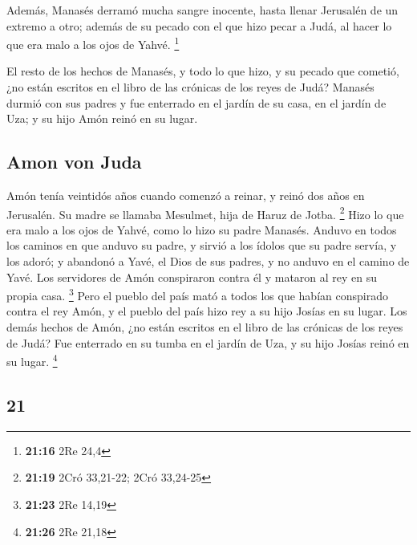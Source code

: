 \begin{paracol}{2}
 Además, Manasés derramó mucha sangre inocente, hasta
llenar Jerusalén de un extremo a otro; además de su pecado con el que
hizo pecar a Judá, al hacer lo que era malo a los ojos de Yahvé.
\footnote{\textbf{21:16} 2Re 24,4}

 El resto de los hechos de Manasés, y todo lo que hizo, y
su pecado que cometió, ¿no están escritos en el libro de las crónicas de
los reyes de Judá?  Manasés durmió con sus padres y fue
enterrado en el jardín de su casa, en el jardín de Uza; y su hijo Amón
reinó en su lugar.

\hypertarget{amon-von-juda}{%
\subsection{Amon von Juda}\label{amon-von-juda}}

 Amón tenía veintidós años cuando comenzó a reinar, y
reinó dos años en Jerusalén. Su madre se llamaba Mesulmet, hija de Haruz
de Jotba. \footnote{\textbf{21:19} 2Cró 33,21-22; 2Cró 33,24-25}
 Hizo lo que era malo a los ojos de Yahvé, como lo hizo
su padre Manasés.  Anduvo en todos los caminos en que
anduvo su padre, y sirvió a los ídolos que su padre servía, y los adoró;
 y abandonó a Yavé, el Dios de sus padres, y no anduvo en
el camino de Yavé.  Los servidores de Amón conspiraron
contra él y mataron al rey en su propia casa. \footnote{\textbf{21:23}
  2Re 14,19}  Pero el pueblo del país mató a todos los
que habían conspirado contra el rey Amón, y el pueblo del país hizo rey
a su hijo Josías en su lugar.  Los demás hechos de Amón,
¿no están escritos en el libro de las crónicas de los reyes de Judá?
 Fue enterrado en su tumba en el jardín de Uza, y su hijo
Josías reinó en su lugar. \footnote{\textbf{21:26} 2Re 21,18}

\switchcolumn
\begin{otherlanguage}{english}

\hypertarget{section-41}{%
\section{21}\label{section-41}}


\end{otherlanguage}
\end{paracol}
